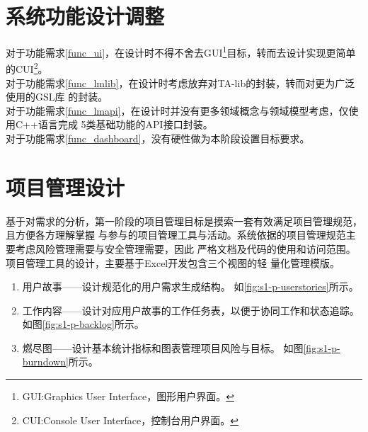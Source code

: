 \section{系统功能设计调整}

对于功能需求\ref{func_ui}，在设计时不得不舍去GUI\footnote{GUI:Graphics User Interface，图形用户界面。}目标，转而去设计实现更简单的CUI\footnote{CUI:Console User Interface，控制台用户界面。}。\\

对于功能需求\ref{func_lmlib}，在设计时考虑放弃对TA-lib的封装，转而对更为广泛使用的GSL库
的封装。\\

对于功能需求\ref{func_lmapi}，在设计时并没有更多领域概念与领域模型考虑，仅使用C++语言完成
5类基础功能的API接口封装。\\

对于功能需求\ref{func_dashboard}，没有硬性做为本阶段设置目标要求。

\section{项目管理设计}

基于对需求的分析，第一阶段的项目管理目标是摸索一套有效满足项目管理规范，且方便各方理解掌握
与参与的项目管理工具与活动。系统依据的项目管理规范主要考虑风险管理需要与安全管理需要，因此
严格文档及代码的使用和访问范围。项目管理工具的设计，主要基于Excel开发包含三个视图的轻
量化管理模版。
\begin{enumerate}

\item 用户故事——设计规范化的用户需求生成结构。
如\ref{fig:s1-p-userstories}所示。

\item 工作内容——设计对应用户故事的工作任务表，以便于协同工作和状态追踪。
如图\ref{fig:s1-p-backlog}所示。

\item 燃尽图——设计基本统计指标和图表管理项目风险与目标。
如图\ref{fig:s1-p-burndown}所示。

\end{enumerate}

